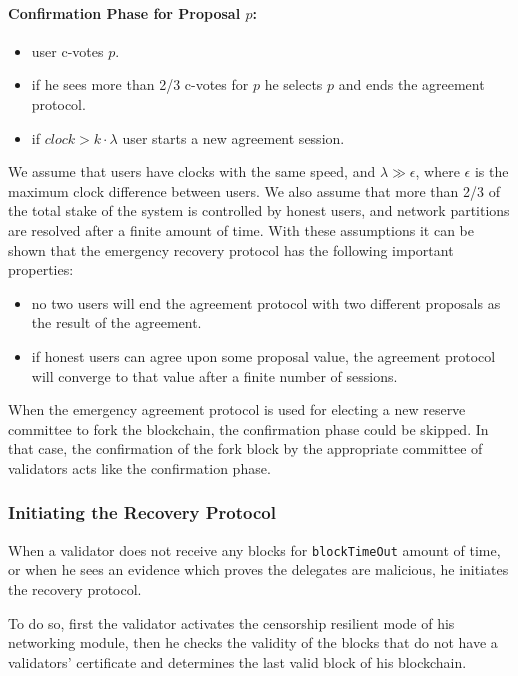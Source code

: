 \paragraph{Confirmation Phase for Proposal $p$:}
\begin{itemize}
    \item user c-votes $p$.
    \item if he sees more than 2/3 c-votes for $p$ he selects $p$ and ends the agreement protocol.
    \item if $clock > k \cdot \lambda$ user starts a new agreement session.
\end{itemize}

We assume that users have clocks with the same speed, and $\lambda \gg \epsilon$, where $\epsilon$ is the maximum
clock difference between users. We also assume that more than 2/3 of the total stake of the system is controlled
by honest users, and network partitions are resolved after a finite amount of time. With these assumptions it can be
shown that the emergency recovery protocol has the following important properties:
\begin{itemize}
    \item no two users will end the agreement protocol with two different proposals as the result of the agreement.
    \item if honest users can agree upon some proposal value, the agreement protocol will converge to that value
    after a finite number of sessions.
\end{itemize}

When the emergency agreement protocol is used for electing a new reserve committee to fork the blockchain, the
confirmation phase could be skipped. In that case, the confirmation of the fork block by the appropriate committee
of validators acts like the confirmation phase.

\subsubsection{Initiating the Recovery Protocol}

When a validator does not receive any blocks for \texttt{blockTimeOut} amount of time, or when he sees an
evidence which proves the delegates are malicious, he initiates the recovery protocol.

To do so, first the validator activates the censorship resilient mode of his networking module, then he checks the
validity of the blocks that do not have a validators' certificate and determines the
last valid block of his blockchain.

